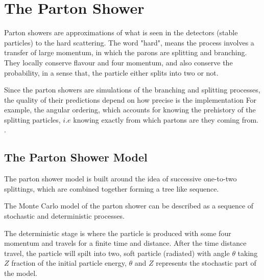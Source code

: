 \chapter{The Parton Shower}

Parton showers are approximations of what is seen in the detectors (stable particles) to the hard scattering. The word "hard", means the process involves a transfer of large momentum, in which the parons are splitting and branching.  
They locally conserve flavour and four momentum, and also conserve the probability, in a sense that, the particle either splits into two or not.
 
Since the parton showers are simulations of the branching and splitting processes, the quality of their predictions depend on how precise is the implementation For example, the angular ordering, which accounts for knowing the prehistory of the splitting particles, $i.e$
knowing exactly from which partons are they coming from. \citep{introduction}.

\section{The Parton Shower Model}
The parton shower model is built around the idea of successive one-to-two splittings, which are combined together forming a tree like sequence.

The Monte Carlo model of the parton shower can be described as a sequence of stochastic and deterministic processes. 

The deterministic stage is where the particle is produced with some four momentum and travels for a finite time and distance.
After the time distance travel, the particle will spilt into two,
soft particle (radiated) with angle $\theta$ taking $Z$ fraction of the initial particle energy, $\theta$ and $Z$ represents the stochastic part of the model.
 
